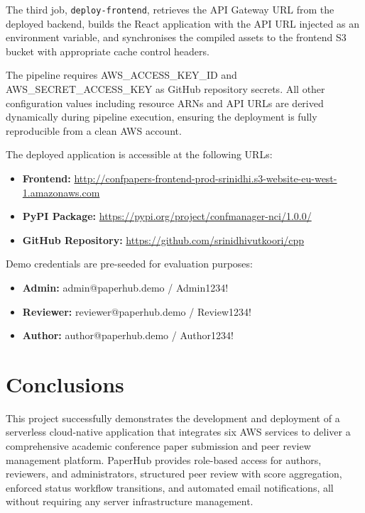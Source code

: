 \documentclass[conference]{IEEEtran}
\begin{document}
The third job, \texttt{deploy-frontend}, retrieves the API Gateway URL from the deployed backend, builds the React application with the API URL injected as an environment variable, and synchronises the compiled assets to the frontend S3 bucket with appropriate cache control headers.

The pipeline requires AWS\_ACCESS\_KEY\_ID and AWS\_SECRET\_ACCESS\_KEY as GitHub repository secrets. All other configuration values including resource ARNs and API URLs are derived dynamically during pipeline execution, ensuring the deployment is fully reproducible from a clean AWS account.

The deployed application is accessible at the following URLs:

\begin{itemize}
    \item \textbf{Frontend:} \url{http://confpapers-frontend-prod-srinidhi.s3-website-eu-west-1.amazonaws.com}
    \item \textbf{PyPI Package:} \url{https://pypi.org/project/confmanager-nci/1.0.0/}
    \item \textbf{GitHub Repository:} \url{https://github.com/srinidhivutkoori/cpp}
\end{itemize}

Demo credentials are pre-seeded for evaluation purposes:

\begin{itemize}
    \item \textbf{Admin:} admin@paperhub.demo / Admin1234!
    \item \textbf{Reviewer:} reviewer@paperhub.demo / Review1234!
    \item \textbf{Author:} author@paperhub.demo / Author1234!
\end{itemize}

\section{Conclusions}

This project successfully demonstrates the development and deployment of a serverless cloud-native application that integrates six AWS services to deliver a comprehensive academic conference paper submission and peer review management platform. PaperHub provides role-based access for authors, reviewers, and administrators, structured peer review with score aggregation, enforced status workflow transitions, and automated email notifications, all without requiring any server infrastructure management.
\end{document}
